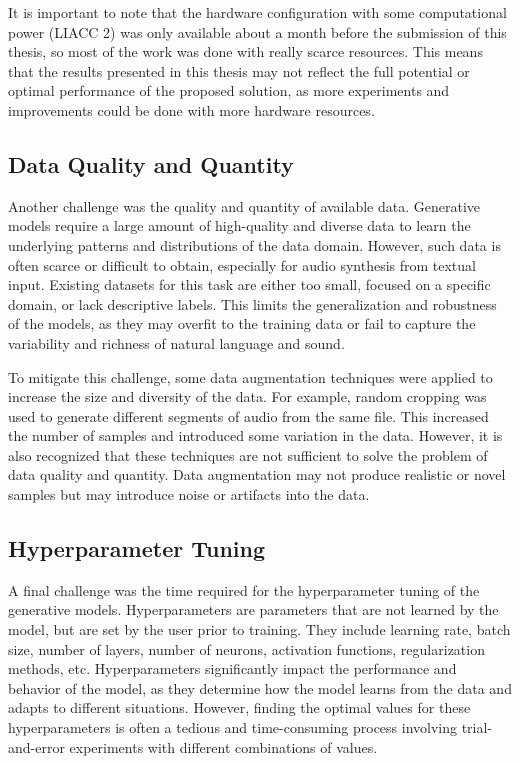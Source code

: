 It is important to note that the hardware configuration with some computational power (\ac{LIACC} 2) was only available about a month before the submission of this thesis, so most of the work was done with really scarce resources. This means that the results presented in this thesis may not reflect the full potential or optimal performance of the proposed solution, as more experiments and improvements could be done with more hardware resources.

\subsection{Data Quality and Quantity}

Another challenge was the quality and quantity of available data. Generative models require a large amount of high-quality and diverse data to learn the underlying patterns and distributions of the data domain. However, such data is often scarce or difficult to obtain, especially for audio synthesis from textual input. Existing datasets for this task are either too small, focused on a specific domain, or lack descriptive labels. This limits the generalization and robustness of the models, as they may overfit to the training data or fail to capture the variability and richness of natural language and sound.

To mitigate this challenge, some data augmentation techniques were applied to increase the size and diversity of the data. For example, random cropping was used to generate different segments of audio from the same file. This increased the number of samples and introduced some variation in the data. However, it is also recognized that these techniques are not sufficient to solve the problem of data quality and quantity. Data augmentation may not produce realistic or novel samples but may introduce noise or artifacts into the data.

\subsection{Hyperparameter Tuning}

A final challenge was the time required for the hyperparameter tuning of the generative models. Hyperparameters are parameters that are not learned by the model, but are set by the user prior to training. They include learning rate, batch size, number of layers, number of neurons, activation functions, regularization methods, etc. Hyperparameters significantly impact the performance and behavior of the model, as they determine how the model learns from the data and adapts to different situations. However, finding the optimal values for these hyperparameters is often a tedious and time-consuming process involving trial-and-error experiments with different combinations of values.

